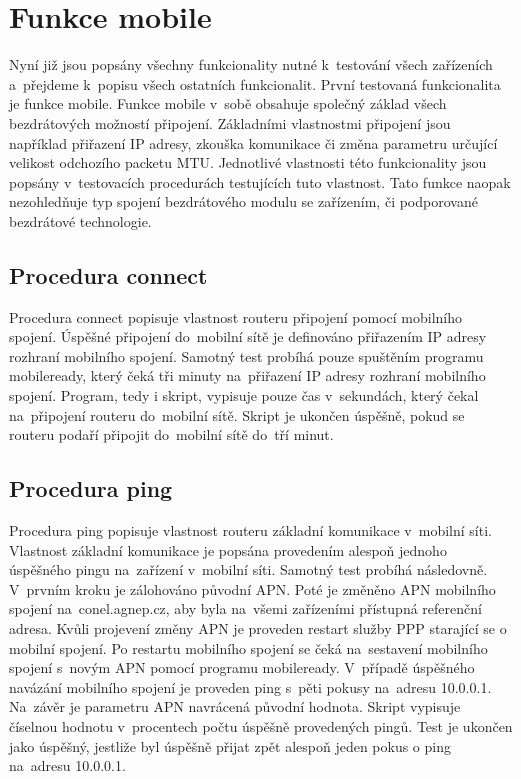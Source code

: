 \section{Funkce mobile}
Nyní již jsou popsány všechny funkcionality nutné k~testování všech zařízeních a~přejdeme k~popisu všech ostatních funkcionalit. První testovaná funkcionalita je funkce mobile. Funkce mobile v~sobě obsahuje společný základ všech bezdrátových možností připojení. Základními vlastnostmi připojení jsou například přiřazení IP adresy, zkouška komunikace či změna parametru určující velikost odchozího packetu MTU. Jednotlivé vlastnosti této funkcionality jsou popsány v~testovacích procedurách testujících tuto vlastnost. Tato funkce naopak nezohledňuje typ spojení bezdrátového modulu se zařízením, či podporované bezdrátové technologie. \cite{commands}

\subsection{Procedura connect}
Procedura connect popisuje vlastnost routeru připojení pomocí mobilního spojení. Úspěšné připojení do~mobilní sítě je definováno přiřazením IP adresy rozhraní mobilního spojení. Samotný test probíhá pouze spuštěním programu mobileready, který čeká tři minuty na~přiřazení IP adresy rozhraní mobilního spojení. Program, tedy i skript, vypisuje pouze čas v~sekundách, který čekal na~připojení routeru do~mobilní sítě. Skript je ukončen úspěšně, pokud se routeru podaří připojit do~mobilní sítě do~tří minut.

\subsection{Procedura ping}
Procedura ping popisuje vlastnost routeru základní komunikace v~mobilní síti. Vlastnost základní komunikace je popsána provedením alespoň jednoho úspěšného pingu na~zařízení v~mobilní síti. Samotný test probíhá následovně. V~prvním kroku je zálohováno původní APN. Poté je změněno APN mobilního spojení na~conel.agnep.cz, aby byla na~všemi zařízeními přístupná referenční adresa. Kvůli projevení změny APN je proveden restart služby PPP starající se o mobilní spojení. Po restartu mobilního spojení se čeká na~sestavení mobilního spojení s~novým APN pomocí programu mobileready. V~případě úspěšného navázání mobilního spojení je proveden ping s~pěti pokusy na~adresu 10.0.0.1. Na~závěr je parametru APN navrácená původní hodnota. Skript vypisuje číselnou hodnotu v~procentech počtu úspěšně provedených pingů. Test je ukončen jako úspěšný, jestliže byl úspěšně přijat zpět alespoň jeden pokus o ping na~adresu 10.0.0.1.

